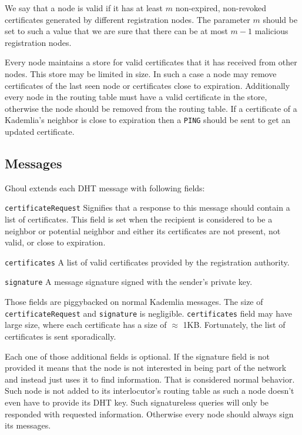 We say that a node is valid if it has at least $m$ non-expired, non-revoked
certificates generated by different registration nodes. The parameter $m$ should
be set to such a value that we are sure that there can be at most $m-1$
malicious registration nodes.

Every node maintains a store for valid certificates that it has received from
other nodes. This store may be limited in size. In such a case a node may remove
certificates of the last seen node or certificates close to expiration.
Additionally every node in the routing table must have a valid certificate in
the store, otherwise the node should be removed from the routing table. If a
certificate of a Kademlia's neighbor is close to expiration then a
\texttt{PING} should be sent to get an updated certificate.

\subsection{Messages}
Ghoul extends each DHT message with following fields:
\begin{description}
  \item{\texttt{certificateRequest}} Signifies that a response to this message
    should contain a list of certificates. This field is set when the recipient
    is considered to be a neighbor or potential neighbor and either its
    certificates are not present, not valid, or close to expiration.
  \item{\texttt{certificates}} A list of valid certificates provided by the
    registration authority.
  \item{\texttt{signature}} A message signature signed with the sender's private
    key.
\end{description}

Those fields are piggybacked on normal Kademlia messages. The size of
\texttt{certificateRequest} and \texttt{signature} is negligible.
\texttt{certificates} field may have large size, where each certificate has a
size of $\approx$ 1KB. Fortunately, the list of certificates is sent
sporadically.

Each one of those additional fields is optional. If the signature field is not
provided it means that the node is not interested in being part of the network
and instead just uses it to find information. That is considered normal
behavior. Such node is not added to its interlocutor's routing table as such a
node doesn't even have to provide its DHT key. Such signatureless queries
will only be responded with requested information.
Otherwise every node should always sign its messages.

